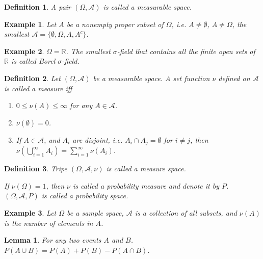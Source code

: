\documentclass[11pt]{article}
\def\MA{{\mathcal A}}
\def\BR{{\mathbb R}}
\newtheorem{lemma}{Lemma}[section]
\newtheorem{definition}{Definition}[section]
\newtheorem{example}{Example}[section]
\begin{document}
\begin{definition}
A pair $(\Omega, \MA)$ is called a measurable space.
\end{definition}

\begin{example}
Let $A$ be a nonempty proper subset of $\Omega$, i.e. $A \neq \emptyset$, $A\neq \Omega$,
the smallest $\MA = \{\emptyset, \Omega, A, A^c\}$.
\end{example}

\begin{example}
$\Omega = \BR$. The smallest $\sigma$-field that contains all the finite open sets of $\BR$  is called Borel $\sigma$-field.
\end{example}

\begin{definition}
Let $(\Omega, \MA)$ be a measurable space. A set function $\nu$ defined on $\MA$ is called a measure iff
\begin{enumerate}
\item $0 \leq \nu(A) \leq \infty$ for any $A \in \MA$.
\item $\nu(\emptyset) = 0$.
\item If $A \in \MA$, and $A_i$ are disjoint, i.e. $A_i \cap A_j = \emptyset$ for $i \neq j$,
then $\nu(\bigcup_{i=1}^\infty A_i) = \sum_{i=1}^\infty \nu(A_i)$.
\end{enumerate}
\end{definition}

\begin{definition}
Tripe $(\Omega, \MA, \nu)$ is called a measure space.

If $\nu(\Omega) = 1$, then $\nu$ is called a probability measure and denote it by $P$.
$(\Omega, \MA, P)$ is called a probability space.
\end{definition}

\begin{example}
Let $\Omega$ be a sample space, $\MA$ is a collection of all subsets, and $\nu(A)$ is the number of elements in $A$.
\end{example}

\begin{lemma}
For any two events $A$ and $B$. $P(A \cup B) = P(A) + P(B) - P(A \cap B)$.
\end{lemma}
\end{document}
